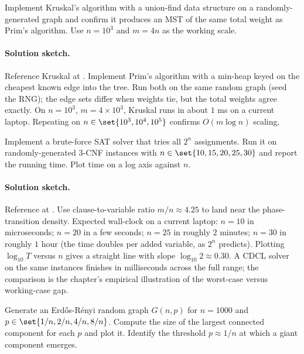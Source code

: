\begin{exercise}
Implement Kruskal's algorithm with a union-find data structure on
a randomly-generated graph and confirm it produces an MST of the
same total weight as Prim's algorithm. Use $n = 10^{3}$ and $m = 4
n$ as the working scale.
\end{exercise}

\paragraph{Solution sketch.}
Reference Kruskal at
.
Implement Prim's algorithm with a min-heap keyed on the cheapest
known edge into the tree. Run both on the same random graph (seed
the RNG); the edge sets differ when weights tie, but the total
weights agree exactly. On $n = 10^{3}$, $m = 4 \times 10^{3}$,
Kruskal runs in about $1$ ms on a current laptop. Repeating on
$n \in \set{10^{3}, 10^{4}, 10^{5}}$ confirms $O(m \log n)$
scaling.

\begin{exercise}
Implement a brute-force SAT solver that tries all $2^{n}$
assignments. Run it on randomly-generated $3$-CNF instances with
$n \in \set{10, 15, 20, 25, 30}$ and report the running time.
Plot time on a log axis against $n$.
\end{exercise}

\paragraph{Solution sketch.}
Reference at
.
Use clause-to-variable ratio $m/n \approx 4.25$ to land near the
phase-transition density. Expected wall-clock on a current laptop:
$n = 10$ in microseconds; $n = 20$ in a few seconds; $n = 25$ in
roughly $2$ minutes; $n = 30$ in roughly $1$ hour (the time
doubles per added variable, as $2^{n}$ predicts). Plotting
$\log_{10} T$ versus $n$ gives a straight line with slope
$\log_{10} 2 \approx 0.30$. A CDCL solver on the same instances
finishes in milliseconds across the full range; the comparison is
the chapter's empirical illustration of the worst-case versus
working-case gap.

\begin{exercise}
Generate an Erd\H{o}s-R\'{e}nyi random graph $G(n, p)$ for $n =
1000$ and $p \in \set{1/n, 2/n, 4/n, 8/n}$. Compute the size of
the largest connected component for each $p$ and plot it. Identify
the threshold $p \approx 1/n$ at which a giant component emerges.
\end{exercise}

